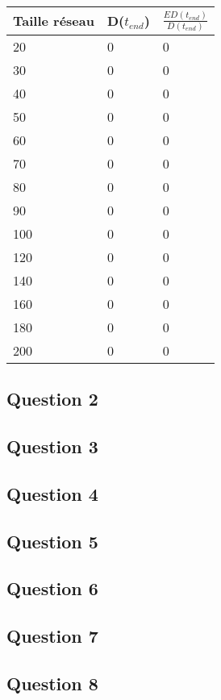 \documentclass[10pt]{report}
\begin{document}
\begin{center}
\begin{tabular}{|l|l|l|}
  \hline
  Taille réseau & D($t_{end}$) & $\frac{ED(t_{end})}{D(t_{end})}$\\
  \hline
	20 & 0 & 0\\
  \hline
  	30 & 0 & 0\\
  \hline
  	40 & 0 & 0\\
  \hline
  	50 & 0 & 0\\
  \hline
  	60 & 0 & 0\\
  \hline
  	70 & 0 & 0\\
  \hline
        80 & 0 & 0\\
  \hline
  	90 & 0 & 0\\
  \hline
  	100 & 0 & 0\\
  \hline
  	120 & 0 & 0\\
  \hline
  	140 & 0 & 0\\
  \hline
  	160 & 0 & 0\\
  \hline
  	180 & 0 & 0\\
  \hline
  	200 & 0 & 0\\
  \hline
\end{tabular}
\end{center}

\subsection{Question 2}
\subsection{Question 3}
\subsection{Question 4}
\subsection{Question 5}
\subsection{Question 6}
\subsection{Question 7}
\subsection{Question 8}
\end{document}
